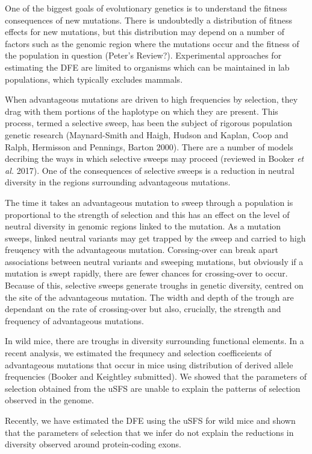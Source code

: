 \documentclass{article}
\begin{document}
One of the biggest goals of evolutionary genetics is to understand the fitness consequences of new mutations. There is undoubtedly a distribution of fitness effects for new mutations, but this distribution may depend on a number of factors such as the genomic region where the mutations occur and the fitness of the population in question (Peter's Review?). Experimental approaches for estimating the DFE are limited to organisms which can be maintained in lab populations, which typically excludes mammals. 

When advantageous mutations are driven to high frequencies by selection, they drag with them portions of the haplotype on which they are present. This process, termed a selective sweep, has been the subject of rigorous population genetic research (Maynard-Smith and Haigh, Hudson and Kaplan, Coop and Ralph, Hermisson and Pennings, Barton 2000). There are a number of models decribing the ways in which selective sweeps may proceed (reviewed in Booker \textit{et al.} 2017). One of the consequences of selective sweeps is a reduction in neutral diversity in the regions surrounding advantageous mutations. 

The time it takes an advantageous mutation to sweep through a population is proportional to the strength of selection and this has an effect on the level of neutral diversity in genomic regions linked to the mutation. As a mutation sweeps, linked neutral variants may get trapped by the sweep and carried to high freuqency with the advantageous mutation. Corssing-over can break apart associations between neutral variants and sweeping mutations, but obviously if a mutation is swept rapidly, there are fewer chances for crossing-over to occur. Because of this, selective sweeps generate troughs in genetic diversity, centred on the site of the advantageous mutation. The width and depth of the trough are dependant on the rate of crossing-over but also, crucially, the strength and frequency of advantageous mutations.

In wild mice, there are troughs in diversity surrounding functional elements. In a recent analysis, we estimated the frequnecy and selection coefficeients of advantageous mutations that occur in mice using distribution of derived allele frequencies (Booker and Keightley submitted). We showed that the parameters of selection obtained from the uSFS are unable to explain the patterns of selection observed in the genome.

Recently, we have estimated the DFE using the uSFS for wild mice and shown that the parameters of selection that we infer do not explain the reductions in diversity observed around protein-coding exons. 
\end{document}
